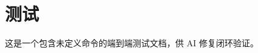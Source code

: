 \documentclass[UTF8]{ctexart}
\begin{document}
\section{测试}

这是一个包含未定义命令的端到端测试文档，供 AI 修复闭环验证。

\undefinedcmd
\end{document}
